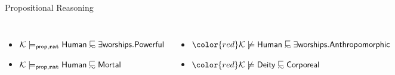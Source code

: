 \documentclass[10pt, xcolor=dvipsnames]{beamer}
\begin{document}
\begin{frame}{Propositional Reasoning}
{ 
  }

  \medskip 

  \begin{columns}

  {\footnotesize
  \begin{itemize}
    \item $\Kmc \propratModels \dlFont{Human} \definc \exists \dlFont{worships}.\dlFont{Powerful}$
    \item $\Kmc \propratModels \dlFont{Human} \definc \dlFont{Mortal}$
  \end{itemize}
  }
\pause
  {\footnotesize
  \begin{itemize}
    \item $\color{red} \Kmc \not\models \dlFont{Human} \definc \exists \dlFont{worships}.\dlFont{Anthropomorphic}$
    \item $\color{red} \Kmc \not\models \dlFont{Deity} \definc \dlFont{Corporeal}$
  \end{itemize}
  }

\end{columns}
\end{frame}
\end{document}
